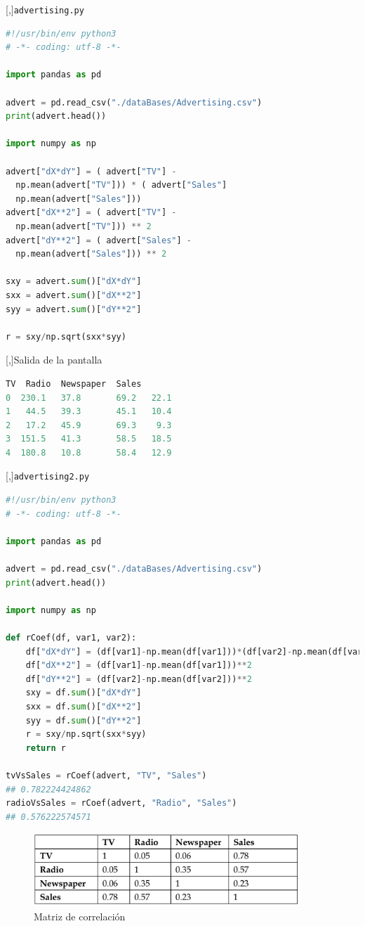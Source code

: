 [,]{\texttt{advertising.py}}
\begin{lstlisting}[language=Python]
#!/usr/bin/env python3
# -*- coding: utf-8 -*-

import pandas as pd

advert = pd.read_csv("./dataBases/Advertising.csv")
print(advert.head())

import numpy as np

advert["dX*dY"] = ( advert["TV"] -
  np.mean(advert["TV"])) * ( advert["Sales"]
  np.mean(advert["Sales"]))
advert["dX**2"] = ( advert["TV"] -
  np.mean(advert["TV"])) ** 2
advert["dY**2"] = ( advert["Sales"] -
  np.mean(advert["Sales"])) ** 2

sxy = advert.sum()["dX*dY"]
sxx = advert.sum()["dX**2"]
syy = advert.sum()["dY**2"]

r = sxy/np.sqrt(sxx*syy)
\end{lstlisting}


[,]{Salida de la pantalla}
\begin{lstlisting}[language=Python]
      TV  Radio  Newspaper  Sales
0  230.1   37.8       69.2   22.1
1   44.5   39.3       45.1   10.4
2   17.2   45.9       69.3    9.3
3  151.5   41.3       58.5   18.5
4  180.8   10.8       58.4   12.9
\end{lstlisting}



[,]{\texttt{advertising2.py}}
\begin{lstlisting}[language=Python]
#!/usr/bin/env python3
# -*- coding: utf-8 -*-

import pandas as pd

advert = pd.read_csv("./dataBases/Advertising.csv")
print(advert.head())

import numpy as np

def rCoef(df, var1, var2):
    df["dX*dY"] = (df[var1]-np.mean(df[var1]))*(df[var2]-np.mean(df[var2]))
    df["dX**2"] = (df[var1]-np.mean(df[var1]))**2
    df["dY**2"] = (df[var2]-np.mean(df[var2]))**2
    sxy = df.sum()["dX*dY"]
    sxx = df.sum()["dX**2"]
    syy = df.sum()["dY**2"]
    r = sxy/np.sqrt(sxx*syy)
    return r

tvVsSales = rCoef(advert, "TV", "Sales")
## 0.782224424862
radioVsSales = rCoef(advert, "Radio", "Sales")
## 0.576222574571
\end{lstlisting}




\begin{figure}
 \centering
 \includegraphics[width=10cm,keepaspectratio=true]{./images/correlationMatrix.png}
 \caption{Matriz de correlación}
 \label{correlationMatrix}
\end{figure}



